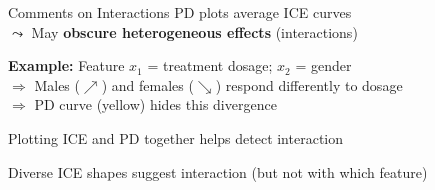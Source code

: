 \documentclass[10pt,compress,t,notes=noshow, xcolor=table]{beamer}
\begin{document}
\begin{framev}[align=top]{Comments on Interactions}
PD plots average ICE curves \\$\leadsto$ May \textbf{obscure heterogeneous effects} (interactions)
\begin{itemizeM}
\item \textbf{Example:} Feature $x_1$ = treatment dosage; $x_2$ = gender \\
\(\Rightarrow\)  Males ($\nearrow$) and females ($\searrow$) respond differently to dosage\\
\(\Rightarrow\)  PD curve (yellow) hides this divergence
\item Plotting ICE and PD together helps detect interaction
\item Diverse ICE shapes suggest interaction  (but not with which feature)
\end{itemizeM}

\end{framev}
\end{document}

